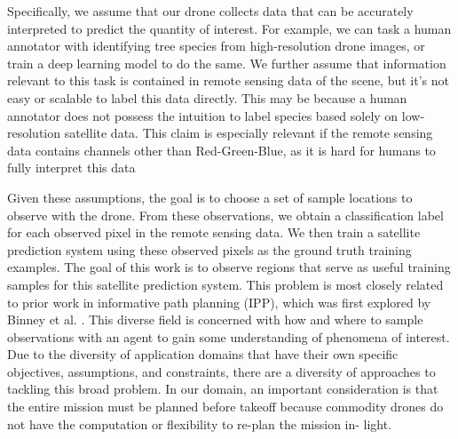 Specifically, we assume that our drone collects data that can be accurately interpreted to predict the quantity of interest. For example, we can task a human annotator with identifying tree species from high-resolution drone images, or train a deep learning model to do the same. We further assume that information relevant to this task is contained in remote sensing data of the scene, but it's not easy or scalable to label this data directly. This may be because a human annotator does not possess the intuition to label species based solely on low-resolution satellite data. This claim is especially relevant if the remote sensing data contains channels other than Red-Green-Blue, as it is hard for humans to fully interpret this data 

Given these assumptions, the goal is to choose a set of sample locations to observe with the drone. From these observations, we obtain a classification label for each observed pixel in the remote sensing data. We then train a satellite prediction system using these observed pixels as the ground truth training examples. The goal of this work is to observe regions that serve as useful training samples for this satellite prediction system. 
This problem is most closely related to prior work in informative path planning (IPP), which was first explored by Binney et al. \cite{Binney2013OptimizingPhenomena}. This diverse field is concerned with how and where to sample observations with an agent to gain some understanding of phenomena of interest. Due to the diversity of application domains that have their own specific objectives, assumptions, and constraints, there are a diversity of approaches to tackling this broad problem. In our domain, an important consideration is that the entire mission must be planned before takeoff because commodity drones do not have the computation or flexibility to re-plan the mission in- light.

